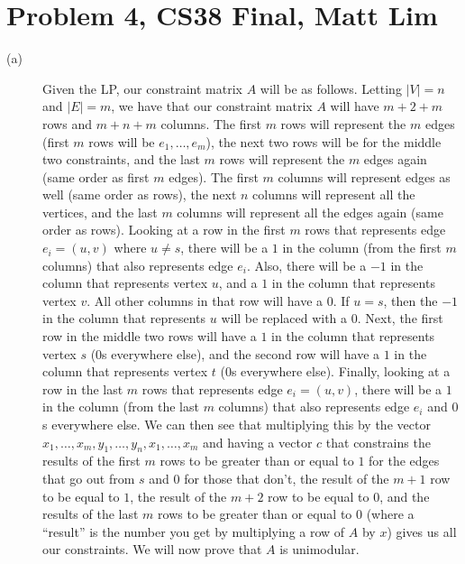 \documentclass{article}
\begin{document}
\section*{Problem 4, CS38 Final, Matt Lim}
\begin{description}
    \item[(a)] Given the LP, our constraint matrix $A$ will be as follows. Letting
        $|V| = n$ and $|E| = m$, we have that our constraint matrix $A$ will
        have $m + 2 + m$ rows and $m + n + m$ columns. The first $m$ rows will represent the $m$
        edges (first $m$ rows will be $e_1, \dots, e_m$), the next two rows will be for the middle two
        constraints, and the last $m$ rows will represent the $m$ edges again
        (same order as first $m$ edges). The first $m$ columns will represent
        edges as well (same order as rows), the
        next $n$ columns will represent all the vertices, and the last $m$
        columns will represent all the edges again (same order as rows). Looking at a
        row in the first $m$ rows that represents edge $e_i = (u,v)$ where $u
        \neq s$, there will be a $1$ in the
        column (from the first $m$ columns) that also represents edge $e_i$. Also, there will be a $-1$ in
        the column that represents vertex $u$, and a $1$ in the column that
        represents vertex $v$. All other columns in that row will have a $0$. If
        $u = s$, then the $-1$ in the column that represents $u$ will be
        replaced with a $0$.  Next, the first row in the middle two rows will have
        a $1$ in the column that represents vertex $s$ ($0$s everywhere else),
        and the second row will have a $1$ in the column
        that represents vertex $t$ ($0$s everywhere else). Finally, looking at
        a row in the last $m$ rows that represents edge $e_i = (u,v)$, there
        will be a $1$ in the
        column (from the last $m$ columns) that also represents edge $e_i$ and
        $0$s everywhere else.  We can then see that multiplying this by the
        vector $x_1, \dots, x_m, y_1, \dots, y_n, x_1, \dots, x_m$ and having a vector $c$ that
        constrains the results of the first $m$ rows to be greater than or
        equal to $1$ for the edges that go out from $s$ and $0$ for those that
        don't, the result of the $m+1$ row to be equal to $1$,
        the result of the $m+2$ row to be equal to $0$, and the results of the
        last $m$ rows to be greater than or equal to $0$ (where a ``result'' is the
        number you get by multiplying a row of $A$ by $x$) gives us all our
        constraints. We will now prove that $A$ is unimodular.


\end{description}
\end{document}
